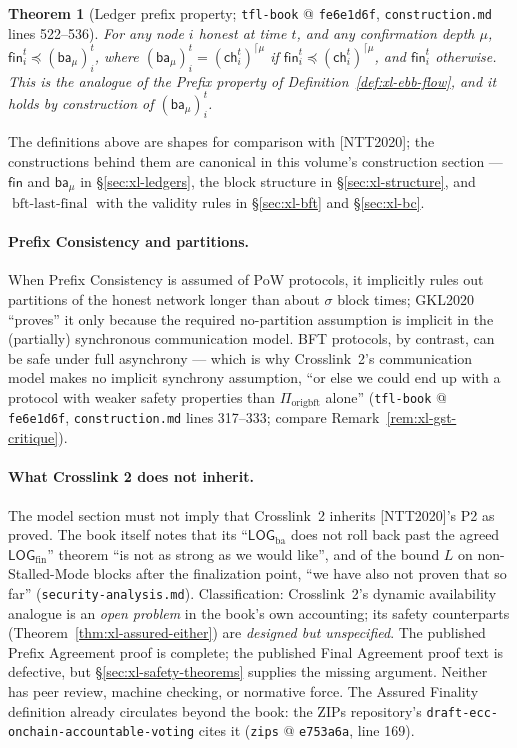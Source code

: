 \documentclass[11pt,a4paper]{article}
\newtheorem{theorem}{Theorem}[section]
\theoremstyle{definition}
\begin{document}
\begin{theorem}[Ledger prefix property; \texttt{tfl-book} @
\texttt{fe6e1d6f}, \texttt{construction.md} lines 522--536]
\label{thm:xl-ledger-prefix-ntt}
For any node $i$ honest at time $t$, and any confirmation depth $\mu$,
$\mathsf{fin}_i^t \preceq (\mathsf{ba}_\mu)_i^t$, where
$(\mathsf{ba}_\mu)_i^t = (\mathsf{ch}_i^t)^{\lceil\mu}$ if
$\mathsf{fin}_i^t \preceq (\mathsf{ch}_i^t)^{\lceil\mu}$, and
$\mathsf{fin}_i^t$ otherwise. This is the analogue of the Prefix property
of Definition~\ref{def:xl-ebb-flow}, and it holds by construction of
$(\mathsf{ba}_\mu)_i^t$.
\end{theorem}

The definitions above are shapes for comparison with [NTT2020]; the
constructions behind them are canonical in this volume's construction
section --- $\mathsf{fin}$ and $\mathsf{ba}_{\mu}$ in
\S\ref{sec:xl-ledgers}, the block structure in \S\ref{sec:xl-structure},
and $\operatorname{bft\text{-}last\text{-}final}$ with the validity
rules in \S\ref{sec:xl-bft} and \S\ref{sec:xl-bc}.

\paragraph{Prefix Consistency and partitions.} When Prefix Consistency is
assumed of PoW protocols, it implicitly rules out partitions of the honest
network longer than about $\sigma$ block times; GKL2020 ``proves'' it only
because the required no-partition assumption is implicit in the
(partially) synchronous communication model. BFT protocols, by contrast,
can be safe under full asynchrony --- which is why Crosslink~2's
communication model makes no implicit synchrony assumption, ``or else we
could end up with a protocol with weaker safety properties than
$\Pi_{\mathrm{origbft}}$ alone'' (\texttt{tfl-book} @ \texttt{fe6e1d6f},
\texttt{construction.md} lines 317--333; compare
Remark~\ref{rem:xl-gst-critique}).

\paragraph{What Crosslink 2 does not inherit.} The model section must not
imply that Crosslink~2 inherits [NTT2020]'s P2 as proved. The book itself
notes that its ``$\mathsf{LOG}_{\mathrm{ba}}$ does not roll back past the
agreed $\mathsf{LOG}_{\mathrm{fin}}$'' theorem ``is not as strong as we
would like'', and of the bound $L$ on non-Stalled-Mode blocks after the
finalization point, ``we have also not proven that so far''
(\texttt{security-analysis.md}). Classification: Crosslink~2's dynamic
availability analogue is an \emph{open problem} in the book's own
accounting; its safety counterparts
(Theorem~\ref{thm:xl-assured-either}) are \emph{designed but
unspecified}. The published Prefix Agreement proof is complete; the
published Final Agreement proof text is defective, but
\S\ref{sec:xl-safety-theorems} supplies the missing argument. Neither has
peer review, machine checking, or normative force.
The Assured Finality definition already circulates beyond the book: the
ZIPs repository's \texttt{draft-ecc-onchain-accountable-voting} cites it
(\texttt{zips} @ \texttt{e753a6a}, line 169).
\end{document}
